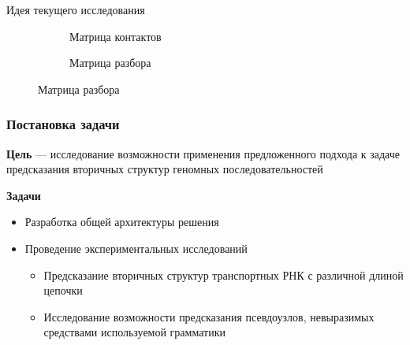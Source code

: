 \documentclass{beamer}
\begin{document}
\begin{frame}{Идея текущего исследования}
{\begin{figure}
\begin{subfigure}{.3\textwidth}
  \caption{Матрица контактов}
\end{subfigure}
\begin{subfigure}{.3\textwidth}
  \centering
  \caption{Матрица разбора}
\end{subfigure}%
\end{figure}
}
\end{frame}

\begin{frame}\frametitle{Постановка задачи}
\textbf{Цель} --- исследование возможности применения предложенного подхода к задаче предсказания вторичных структур геномных последовательностей

\vspace{5mm\onelineskip}

\textbf{Задачи}
\begin{itemize}
    \item Разработка общей архитектуры решения
    \item Проведение экспериментальных исследований
    \begin{itemize}
        \item Предсказание вторичных структур транспортных РНК с различной длиной цепочки
        \item Исследование возможности предсказания псевдоузлов, невыразимых средствами используемой грамматики
    \end{itemize}
\end{itemize}
\end{frame}
\end{document}
